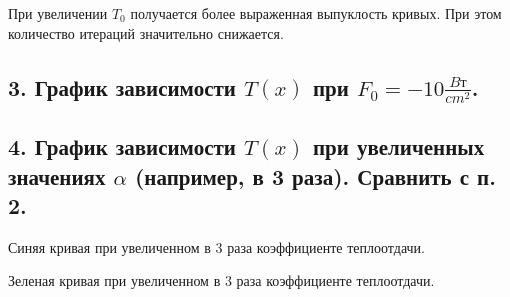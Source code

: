 \documentclass[a4paper,oneside,12pt]{extreport}
\begin{document}
При увеличении $T_0$ получается более выраженная выпуклость кривых.
При этом количество итераций значительно снижается.

\newpage

\subsection{3. График зависимости $T(x)$ при $F_{0} = -10 \frac{Bт}{cm^2}$. }


\begin{figure}[ht!]
\end{figure}

\newpage

\subsection{4. График зависимости $T(x)$ при увеличенных значениях $\alpha$ (например, в 3 раза). Сравнить с п. 2.}

Синяя кривая при увеличенном в 3 раза коэффициенте теплоотдачи.
\begin{figure}[ht!]
\end{figure}

Зеленая кривая при увеличенном в 3 раза коэффициенте теплоотдачи.
\begin{figure}[ht!]
\end{figure}
\end{document}
